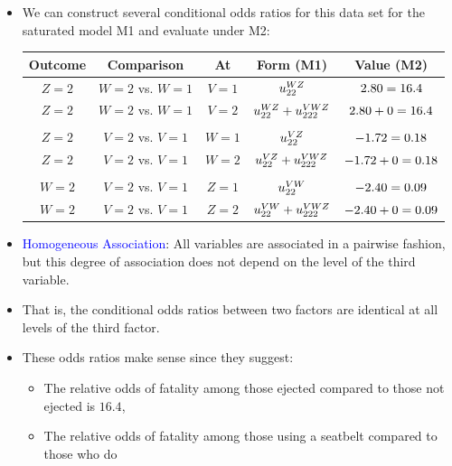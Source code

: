 \documentclass{article}\usepackage[]{graphicx}\usepackage[svgnames]{xcolor}
\let\exp\relax%
\begin{document}
\begin{itemize}
    \item We can construct several conditional odds ratios for this data set for the saturated
          model M1 and evaluate under M2:
          \begin{table}[H]
              \centering
              \begin{NiceTabular}{c|c|c|c|c}
                  \toprule
                  Outcome & Comparison & At & Form (M1) & Value (M2)\\
                  \midrule
                  $ Z=2 $ & $ W=2 $ vs. $ W=1 $ & $ V=1 $ & $ \exp{u_{22}^{WZ}} $ & $ \exp{2.80}=16.4 $\\
                  $ Z=2 $ & $ W=2 $ vs. $ W=1 $ & $ V=2 $ & $ \exp{u_{22}^{WZ}+u_{222}^{VWZ}} $ & $ \exp{2.80+0}=16.4 $\\\\
                  $ Z=2 $ & $ V=2 $ vs. $ V=1 $ & $ W=1 $ & $ \exp{u_{22}^{VZ}} $ & $ \exp{-1.72}=0.18 $\\
                  $ Z=2 $ & $ V=2 $ vs. $ V=1 $ & $ W=2 $ & $ \exp{u_{22}^{VZ}+u_{222}^{VWZ}} $ & $ \exp{-1.72+0}=0.18 $\\\\
                  $ W=2 $ & $ V=2 $ vs. $ V=1 $ & $ Z=1 $ & $ \exp{u_{22}^{VW}} $ & $ \exp{-2.40}=0.09 $\\
                  $ W=2 $ & $ V=2 $ vs. $ V=1 $ & $ Z=2 $ & $ \exp{u_{22}^{VW}+u_{222}^{VWZ}} $ & $ \exp{-2.40+0}=0.09 $\\
                  \bottomrule
              \end{NiceTabular}
          \end{table}
    \item \textcolor{Blue}{Homogeneous Association}: All variables are associated in a pairwise fashion, but
          this degree of association does not depend on the level of the third variable.
    \item That is, the conditional odds ratios between two factors are identical at all levels of
          the third factor.
    \item These odds ratios make sense since they suggest:
          \begin{itemize}
              \item The relative odds of fatality among those ejected compared to those not ejected is
                    $16.4$,
              \item The relative odds of fatality among those using a seatbelt compared to those who do

\end{itemize}
\end{itemize}
\end{document}
